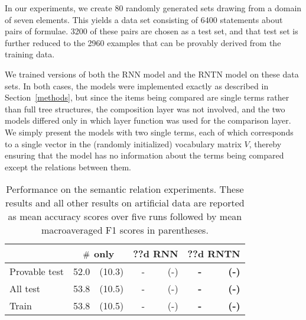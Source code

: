 In our experiments, we create 80 randomly generated sets drawing from
a domain of seven elements. This yields a data set consisting of
6400 statements about pairs of formulae. 3200 of these pairs are
chosen as a test set, and that test set is further reduced to the 2960
examples that can be provably derived from the training data.

We trained versions of both the RNN model and the RNTN model on these
data sets. In both cases, the models were implemented exactly as
described in Section~\ref{methods}, but since the items being compared
are single terms rather than full tree structures, the composition
layer was not involved, and the two models differed only in which
layer function was used for the comparison layer. We simply present
the models with two single terms, each of which corresponds to a
single vector in the (randomly initialized) vocabulary matrix $V$,
thereby ensuring that the model has no information about the terms
being compared except the relations between them.

\begin{table}[tp]
  \centering \small
  \begin{tabular}{ l r@{ \ }r r@{ \ }r r@{ \ }r }
    \toprule
    ~&\multicolumn{2}{c}{$\mathbin{\#}$ only} & \multicolumn{2}{c}{??d RNN}  & \multicolumn{2}{c}{??d RNTN}\\
    \midrule
    Provable test &52.0 &(10.3) &	-&(-)& \textbf{-} & \textbf{(-)}\\
    All test &53.8 &(10.5) &	-&(-)& \textbf{-} & \textbf{(-)}\\
    Train &53.8 &(10.5)    & -&(-)& \textbf{-} & \textbf{(-)}\\

    \bottomrule
  \end{tabular}
  \caption{Performance on the semantic relation experiments. These results and all other results on artificial data are reported as mean accuracy scores over five runs followed by mean macroaveraged F1 scores in parentheses.}
  \label{joinresultstable}
\end{table}

